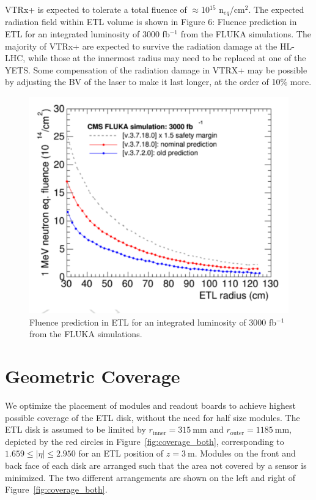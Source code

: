 \documentclass[11pt]{article}
\begin{document}
VTRx+ is expected to tolerate a total fluence of $\approx$10$^{15}$ n$_{eq}$/cm$^{2}$. The expected radiation field within ETL volume is shown in Figure 6: Fluence prediction in ETL for an integrated luminosity of 3000 fb$^{-1}$ from the FLUKA simulations. The majority of VTRx+ are expected to survive the radiation damage at the HL-LHC, while those at the innermost radius may need to be replaced at one of the YETS. Some compensation of the radiation damage in VTRX+ may be possible by adjusting the BV of the laser to make it last longer, at the order of 10\% more.

\begin{figure}[!h]
\centering
\includegraphics[width=\linewidth]{figures/image6.pdf}
\caption{
Fluence prediction in ETL for an integrated luminosity of 3000 fb$^{-1}$ from the FLUKA simulations.}
\label{fig:fluka}
\end{figure}

\section{Geometric Coverage}

We optimize the placement of modules and readout boards to achieve highest possible coverage of the ETL disk, without the need for half size modules.
The ETL disk is assumed to be limited by $r_{\mathrm{inner}}=315~\mathrm{mm}$ and $r_{\mathrm{outer}}=1185~\mathrm{mm}$, depicted by the red circles in Figure~\ref{fig:coverage_both}, corresponding to $1.659 \leq |\eta| \leq 2.950$ for an ETL position of $z=3~\mathrm{m}$.
Modules on the front and back face of each disk are arranged such that the area not covered by a sensor is minimized.
The two different arrangements are shown on the left and right of Figure~\ref{fig:coverage_both}.
\end{document}

